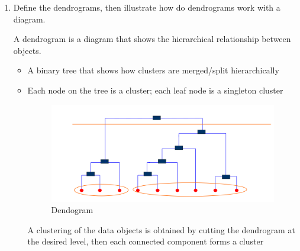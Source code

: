 \documentclass[12pt]{article}
\newenvironment{QandA}{\begin{enumerate}[label=\bfseries\arabic*.]\bfseries}
{\end{enumerate}}
\newenvironment{answered}{\par\normalfont\color{Sepia}}{}
\begin{document}
\begin{QandA}
    \item Define the dendrograms, then illustrate how do dendrograms work with a diagram.
    \begin{answered}
        A dendrogram is a diagram that shows the hierarchical relationship 
        between objects.
        \begin{itemize}
            \item A binary tree that shows how clusters are merged/split hierarchically 
            \item Each node on the tree is a cluster; each leaf node is a singleton cluster
            \begin{figure}[h!]
                \centering
                \includegraphics[width=\textwidth]{dendogram.png}
                \caption{Dendogram}
                \label{fig:dendogram}
            \end{figure}

            A clustering of the data objects is obtained by cutting the dendrogram
            at the desired level, then each connected component forms a cluster
        \end{itemize}
    \end{answered}


\end{QandA}
\end{document}
